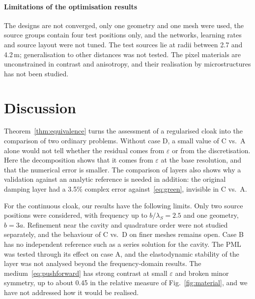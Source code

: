 \documentclass[preprint,12pt]{elsarticle}
\begin{document}
\paragraph{Limitations of the optimisation results} The designs are not converged, only one geometry and one mesh were used, the source groups
contain four test positions only, and the networks, learning rates and source layout were not tuned. The test sources lie at radii between 2.7
and 4.2\,m; generalisation to other distances was not tested. The pixel materials are unconstrained in contrast and anisotropy, and their
realisation by microstructures has not been studied.

\FloatBarrier
\section{Discussion}\label{sec:discussion}

Theorem~\ref{thm:equivalence} turns the assessment of a regularised cloak into the comparison of two ordinary problems. Without case D, a small value of C vs.\ A alone would not tell whether the residual comes from $\varepsilon$ or from the discretisation. Here the decomposition shows that it comes from $\varepsilon$ at the base resolution, and that the numerical error is smaller. The comparison of layers also shows why a validation against an analytic reference is needed in addition: the original damping layer had a 3.5\% complex error against~\eqref{eq:green}, invisible in C vs.\ A.

For the continuous cloak, our results have the following limits. Only two source positions were considered, with frequency up to $b/\lambda_S=2.5$ and one geometry, $b=3a$. Refinement near the cavity and quadrature order were not studied separately, and the behaviour of C vs.\ D on finer meshes remains open. Case B has no independent reference such as a series solution for the cavity. The PML was tested through its effect on case A, and the elastodynamic stability of the layer was not analysed beyond the frequency-domain results. The medium~\eqref{eq:pushforward} has strong contrast at small $\varepsilon$ and broken minor symmetry, up to about 0.45 in the relative measure of Fig.~\ref{fig:material}, and we have not addressed how it would be realised.
\end{document}
